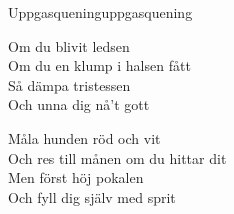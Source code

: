 \begin{song}{Uppgasquening}{uppgasquening}
\begin{vers}
Om du blivit ledsen\\
Om du en klump i halsen fått\\
Så dämpa tristessen\\
Och unna dig nå't gott\\
\end{vers}
\begin{vers}
Måla hunden röd och vit\\
Och res till månen om du hittar dit\\
Men först höj pokalen\\
Och fyll dig själv med sprit\\
\end{vers}
\end{song}
